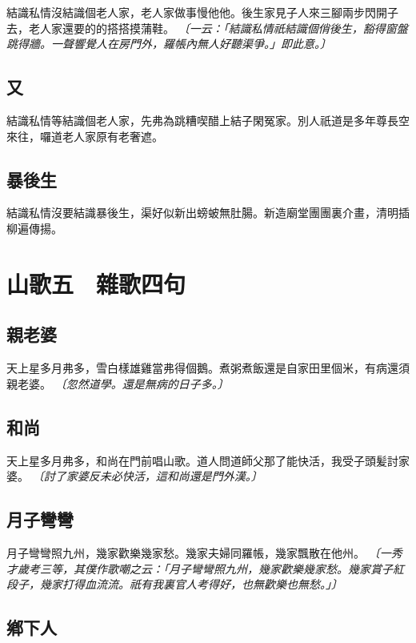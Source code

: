 結識私情沒結識個老人家，老人家做事慢他他。後生家見子人來三腳兩步閃開子去，老人家還要的的搭搭摸蒲鞋。
\textit{〔一云：「結識私情祇結識個俏後生，豁得窗盤跳得牆。一聲響覺人在房門外，羅帳內無人好聽渠爭。」即此意。〕}

\subsection*{又}

結識私情等結識個老人家，先弗為跳糟喫醋上結子閑冤家。別人祇道是多年尊長空來往，囉道老人家原有老奢遮。

\subsection*{暴後生}

結識私情沒要結識暴後生，渠好似新出螃蚾無肚腸。新造廟堂團團裏介畫，清明插柳遍傳揚。


\section*{山歌五　雜歌四句}
\subsection*{親老婆}

天上星多月弗多，雪白樣雄雞當弗得個鵝。煮粥煮飯還是自家田里個米，有病還須親老婆。
\textit{〔忽然道學。還是無病的日子多。〕}

\subsection*{和尚}

天上星多月弗多，和尚在門前唱山歌。道人問道師父那了能快活，我受子頭髪討家婆。
\textit{〔討了家婆反未必快活，這和尚還是門外漢。〕}

\subsection*{月子彎彎}

月子彎彎照九州，幾家歡樂幾家愁。幾家夫婦同羅帳，幾家飄散在他州。
\textit{〔一秀才歲考三等，其僕作歌嘲之云：「月子彎彎照九州，幾家歡樂幾家愁。幾家賞子紅段子，幾家打得血流流。祇有我裏官人考得好，也無歡樂也無愁。」〕}

\subsection*{鄕下人}

